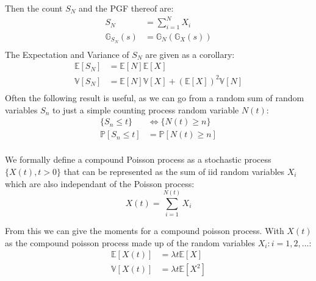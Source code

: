 Then the count \(S_N\) and the PGF thereof are:
\begin{equation*}
    \begin{aligned}
        S_N &= \sum_{i=1}^{N} X_i \\
        \mathbb{G}_{S_N}(s) &= \mathbb{G}_N(\mathbb{G}_X(s)) \\
    \end{aligned}
\end{equation*}
The Expectation and Variance of \(S_N\) are given as a corollary:
\begin{equation*}
    \begin{aligned}
        \mathbb{E}[S_N] &= \mathbb{E}[N] \mathbb{E}[X]\\
        \mathbb{V}[S_N] &= \mathbb{E}[N]\mathbb{V}[X] + \left( \mathbb{E}[X]\right)^2 \mathbb{V}[N]\\
    \end{aligned}
\end{equation*}
Often the following result is useful, as we can go from a random sum of random
variables $S_n$ to just a simple counting process random variable $N(t)$:
\begin{equation*}
    \begin{aligned}
        \{S_n \le t\} &\iff \{N(t) \ge n\} \\
    \mathbb{P}[S_n \le t] &= \mathbb{P}[N(t) \ge n]  \\
    \end{aligned}
\end{equation*}

We formally define a compound Poisson process as a stochastic 
process \(\{X(t), t > 0\}\) that can be represented as the sum of iid random variables \(X_i\) which are also independant of the Poisson process:
\begin{equation*}
    X(t) = \sum_{i = 1}^{N(t)} X_i
\end{equation*}

From this we can give the moments for a compound poisson process. With \(X(t)\) as the 
compound poisson process made up of the random variables \(X_i: i=1, 2, \dots\):
\begin{equation*}
    \begin{aligned}
        \mathbb{E}[X(t)] &= \lambda t \mathbb{E}[X]   \\
        \mathbb{V}[X(t)] &= \lambda t \mathbb{E}[X^2] \\
    \end{aligned}
\end{equation*}
